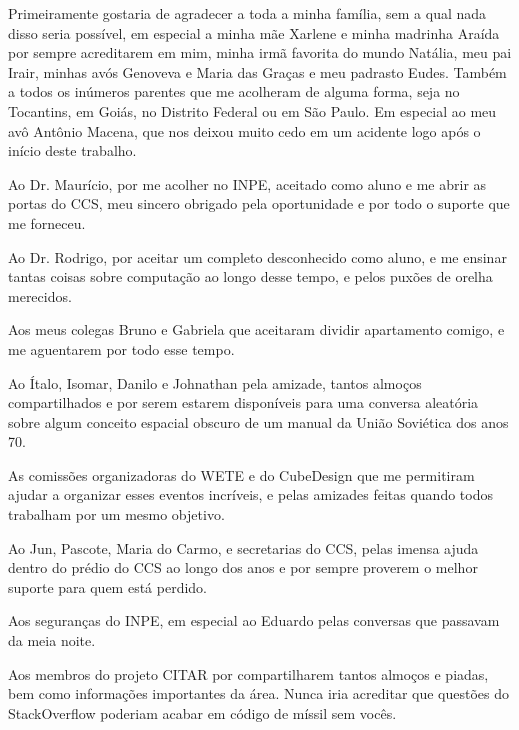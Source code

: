 
\begin{agradecimentos}  %

\hypertarget{estilo:agradecimentos}{} %

Primeiramente gostaria de agradecer a toda a minha família, sem a qual nada disso seria possível, em especial a minha mãe Xarlene e minha madrinha Araída por sempre acreditarem em mim, minha irmã favorita do mundo Natália, meu pai Irair, minhas avós Genoveva e Maria das Graças e meu padrasto Eudes.
Também a todos os inúmeros parentes que me acolheram de alguma forma, seja no Tocantins, em Goiás, no Distrito Federal ou em São Paulo.
Em especial ao meu avô Antônio Macena, que nos deixou muito cedo em um acidente logo após o início deste trabalho.

Ao Dr. Maurício, por me acolher no INPE, aceitado como aluno e me abrir as portas do CCS, meu sincero obrigado pela oportunidade e por todo o suporte que me forneceu.

Ao Dr. Rodrigo, por aceitar um completo desconhecido como aluno, e me ensinar tantas coisas sobre computação ao longo desse tempo, e pelos puxões de orelha merecidos.

Aos meus colegas Bruno e Gabriela que aceitaram dividir apartamento comigo, e me aguentarem por todo esse tempo.

Ao Ítalo, Isomar, Danilo e Johnathan pela amizade, tantos almoços compartilhados e por serem estarem disponíveis para uma conversa aleatória sobre algum conceito espacial obscuro de um manual da União Soviética dos anos 70.

As comissões organizadoras do WETE e do CubeDesign que me permitiram ajudar a organizar esses eventos incríveis, e pelas amizades feitas quando todos trabalham por um mesmo objetivo.

Ao Jun, Pascote, Maria do Carmo, e secretarias do CCS, pelas imensa ajuda dentro do prédio do CCS ao longo dos anos e por sempre proverem o melhor suporte para quem está perdido.

Aos seguranças do INPE, em especial ao Eduardo pelas conversas que passavam da meia noite.

Aos membros do projeto CITAR por compartilharem tantos almoços e piadas, bem como informações importantes da área.
Nunca iria acreditar que questões do StackOverflow poderiam acabar em código de míssil sem vocês.


\end{agradecimentos}
